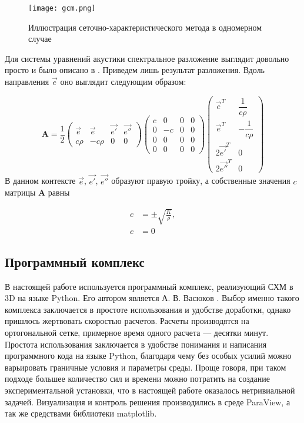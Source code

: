 \begin{figure}[H]
	\centering
	\texttt{[image: gcm.png]}
	\caption{Иллюстрация сеточно-характеристического метода в одномерном случае}
	\label{fig:gcm}
\end{figure}

Для системы уравнений акустики спектральное разложение выглядит довольно просто и было описано в \cite{kazakov}. Приведем лишь результат разложения. Вдоль направления $\vec{e}$ оно выглядит следующим образом:

\begin{equation}
	\mathbf{A} = \frac{1}{2}
	\begin{pmatrix}
		\vec{e} & \vec{e} & \vec{e'} & \vec{e''} \\
		c\rho & -c\rho & 0 & 0
	\end{pmatrix}
	\begin{pmatrix}
		c & 0 & 0 & 0 \\
		0 & -c & 0 & 0 \\
		0 & 0 & 0 & 0 \\
		0 & 0 & 0 & 0
	\end{pmatrix}
	\begin{pmatrix}
		\vec{e}^T & \dfrac{1}{c\rho} \\
		\vec{e}^T & -\dfrac{1}{c\rho} \\
		2\vec{e'}^T & 0 \\
		2\vec{e''}^T & 0
	\end{pmatrix}
\end{equation}
В данном контексте $\vec{e}$, $\vec{e'}$, $\vec{e''}$ образуют правую тройку, а собственные значения $c$ матрицы $\mathbf{A}$ равны

\begin{equation}
	\begin{aligned}
		c &= \pm \sqrt{\frac{K}{\rho}}, \\
		c &= 0
	\end{aligned}
\end{equation}

\subsection{Программный комплекс}
В настоящей работе используется программный комплекс, реализующий СХМ в 3D на языке Python. Его автором является А. В. Васюков \cite{gcm}. Выбор именно такого комплекса заключается в простоте использования и удобстве доработки, однако пришлось жертвовать скоростью расчетов. Расчеты производятся на ортогональной сетке, примерное время одного расчета --- десятки минут. Простота использования заключается в удобстве понимания и написания программного кода на языке Python, благодаря чему без особых усилий можно варьировать граничные условия и параметры среды. Проще говоря, при таком подходе большее количество сил и времени можно потратить на создание экспериментальной установки, что в настоящей работе оказалось нетривиальной задачей. Визуализация и контроль решения производились в среде ParaView, а так же средствами библиотеки matplotlib.

\newpage
